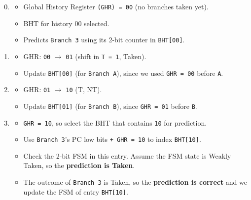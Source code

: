 \begin{enumerate}
    \setcounter{enumi}{-1}
    \item {}
    \begin{itemize}
        \item Global History Register \texttt{(GHR) = 00} (no branches taken yet).
        \item BHT for history 00 selected.
        \item Predicts \texttt{Branch 3} using its 2-bit counter in \texttt{BHT[00]}.
    \end{itemize}

    \item {}
    \begin{itemize}
        \item GHR: \texttt{00} $\rightarrow$ \texttt{01} (shift in \texttt{T = 1}, Taken).
        \item Update \texttt{BHT[00]} (for \texttt{Branch A}), since we used \texttt{GHR = 00} before \texttt{A}.
    \end{itemize}

    \item {}
    \begin{itemize}
        \item GHR: \texttt{01} $\rightarrow$ \texttt{10} (T, NT).
        \item Update \texttt{BHT[01]} (for \texttt{Branch B}), since \texttt{GHR = 01} before \texttt{B}.
    \end{itemize}

    \item {}
    \begin{itemize}
        \item \texttt{GHR = 10}, so select the BHT that contains \texttt{10} for prediction.
        \item Use \texttt{Branch 3}'s PC low bits \texttt{+ GHR = 10} to index \texttt{BHT[10]}.
        \item[\textcolor{Green3}{\faIcon{magic}}] Check the 2-bit FSM in this entry. Assume the FSM state is Weakly Taken, so the \textcolor{Green3}{\textbf{prediction is Taken}}.
        \item[\textcolor{Green3}{\faIcon{\speedIcon}}] The outcome of \texttt{Branch 3} is Taken, so the \textcolor{Green3}{\textbf{prediction is correct}} and we update the FSM of entry \texttt{BHT[10]}.
    \end{itemize}
\end{enumerate}

